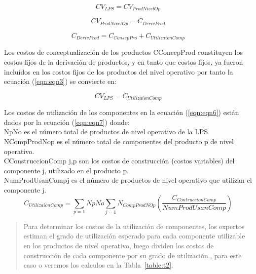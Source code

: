 \documentclass[10pt,a4paper,openany]{book}
\begin{document}
\begin{equation}
CV_{LPS} = CV_{ProdNivelOp}  
\label{eqn:eqn3}
\end{equation}

\begin{equation}
CV_{ProdNivelOp} =  C_{DerivProd} 
\label{eqn:eqn4}
\end{equation}

\begin{equation}
C_{DerivProd} = C_{ConsepPro}  +  C_{UtilizaionComp}
\label{eqn:eqn5}
\end{equation}

Los costos de conceptualización de los productos CConcepProd constituyen los costos fijos de la derivación de productos, y en tanto que costos fijos, ya fueron incluídos en los costos fijos de los productos del nivel operativo por tanto la ecuación (\ref{eqn:eqn3})  se convierte en:

\begin{equation}
CV_{LPS} = C_{UtilizaionComp} 
\label{eqn:eqn6}
\end{equation}

Los costos de utilización de los componentes en la ecuación (\ref{eqn:eqn6}) están dados por la ecuación (\ref{eqn:eqn7}) donde:\\
NpNo es el número total de productos de nivel operativo de la LPS.\\
NCompProdNop es el número total de componentes del producto p de nivel operativo.\\
CConstruccionComp j,p son los costos de construcción (costos variables) del componente j, utilizado en el producto p.\\
NumProdUsanCompj es el número de productos de nivel operativo que utilizan el componente j.\\

\begin{equation}
C_{UtilizaionComp} = \sum_{p=1}NpNo \sum_{j=1}N_{CompProdNOp}\left(\frac{C_{ContruccionComp}}{NumProdUsanComp}\right)
\label{eqn:eqn7}
\end{equation}

\begin{quote}Para determinar los costos de la utilización de componentes, los expertos estiman el grado de utilización esperado para cada componente utilizable en los productos de nivel operativo, luego dividen los costos de construcción de cada componente por su grado de utilización.\cite{8048908}, para este caso o veremos los calculos en la Tabla~\ref{table:t2}.\end{quote}
\end{document}

